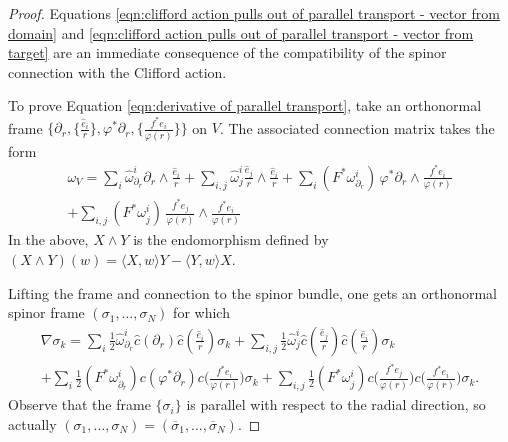 \documentclass[12pt, reqno]{amsart}
\theoremstyle{plain} %
\theoremstyle{definition}
\theoremstyle{remark}
\numberwithin{equation}{section}
\newcommand{\dom}[1]{\hat{#1}}
\newcommand{\cbar}[1]{\dom{c}\left(#1\right)}
\newcommand{\inner}[1]{\langle #1 \rangle}
\begin{document}
\begin{proof}
    Equations \eqref{eqn:clifford action pulls out of parallel transport - vector from domain} and \eqref{eqn:clifford action pulls out of parallel transport - vector from target} are an immediate consequence of the compatibility of the spinor connection with the Clifford action.

    To prove Equation \eqref{eqn:derivative of parallel transport}, take an orthonormal frame \(\big\{\partial_r, \{\frac{\dom{e}_i}{r}\}, \varphi^*\partial_r, \{\frac{f^*e_i}{\varphi(r)}\}\big\}\) on \(V\).
    The associated connection matrix takes the form
    \begin{multline*}
        \omega_V = \sum_i \dom{\omega}_{\partial_r}^i \partial_r \wedge \frac{\dom{e}_i}{r} + \sum_{i,j} \dom{\omega}_j^i \frac{\dom{e}_j}{r} \wedge \frac{\dom{e}_i}{r} + \sum_i (F^*\omega_{\partial_r}^i)\, \varphi^*\partial_r \wedge \frac{f^*e_i}{\varphi(r)} \\
        + \sum_{i,j} (F^*\omega_j^i)\, \frac{f^*e_j}{\varphi(r)} \wedge \frac{f^*e_i}{\varphi(r)}
    \end{multline*}
    In the above, \(X \wedge Y\) is the endomorphism defined by \((X \wedge Y)(w) = \inner{X, w} Y - \inner{Y,w} X\).

    Lifting the frame and connection to the spinor bundle, one gets an orthonormal spinor frame \((\sigma_1, \ldots, \sigma_N)\) for which
    \begin{multline*}
        \nabla \sigma_k = \sum_i \frac{1}{2}\dom{\omega}_{\partial_r}^i \cbar{\partial_r} \cbar{\frac{\dom{e}_i}{r}} \sigma_k + \sum_{i,j} \frac{1}{2}\dom{\omega}_j^i \cbar{\frac{\dom{e}_j}{r}} \cbar{\frac{\dom{e}_i}{r}} \sigma_k \\
        + \sum_i \frac{1}{2} (F^*\omega_{\partial_r}^i) c(\varphi^* \partial_r) c\Big(\frac{f^*e_i}{\varphi(r)}\Big) \sigma_k + \sum_{i,j} \frac{1}{2} (F^*\omega_j^i) c\Big(\frac{f^*e_j}{\varphi(r)}\Big) c\Big(\frac{f^*e_i}{\varphi(r)}\Big) \sigma_k.
    \end{multline*}
    Observe that the frame \(\{\sigma_i\}\) is parallel with respect to the radial direction, so actually \((\sigma_1, \ldots, \sigma_N) = (\overline{\sigma}_1, \ldots, \overline{\sigma}_N)\).


\end{proof}
\end{document}
